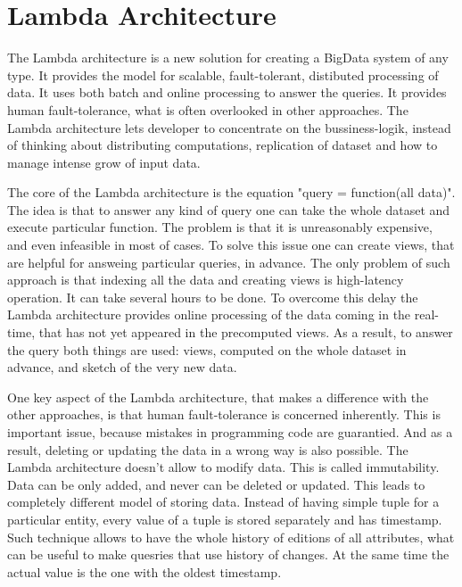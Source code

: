 \chapter{Lambda Architecture}
\label{chap:lambda_architecture}

The Lambda architecture \cite{MarzWarren201401} is a new solution
for creating a BigData system of any type. It provides the model for scalable,
fault-tolerant, distibuted processing of data. It uses both batch and online
processing to answer the queries. It provides human fault-tolerance, what is
often overlooked in other approaches. The Lambda architecture lets developer to
concentrate on the bussiness-logik, instead of thinking about distributing
computations, replication of dataset and how to manage intense grow of input data.

The core of the Lambda architecture is the equation "query = function(all
data)". The idea is that to answer any kind of query one can take the whole
dataset and execute particular function. The problem is that it is unreasonably
expensive, and even infeasible in most of cases. To solve this issue one can
create views, that are helpful for answeing particular queries, in advance. The
only problem of such approach is that indexing all the data and creating views
is high-latency operation. It can take several hours to be done. To overcome
this delay the Lambda architecture provides online processing of the data coming
in the real-time, that has not yet appeared in the precomputed views. As a
result, to answer the query both things are used: views, computed on the whole
dataset in advance, and sketch of the very new data.

One key aspect of the Lambda architecture, that makes a difference with the
other approaches, is that human fault-tolerance is concerned inherently. This is
important issue, because mistakes in programming code are guarantied. And as a
result, deleting or updating the data in a wrong way is also possible. The Lambda
architecture doesn't allow to modify data. This is called 
immutability. Data can be only added, and never can be deleted or updated. This
leads to completely different model of storing data. Instead of having simple
tuple for a particular entity, every value of a tuple is stored separately and
has timestamp. Such technique allows to have the whole history of editions of
all attributes, what can be useful to make quesries that use history of changes.
At the same time the actual value is the one with the oldest timestamp.


